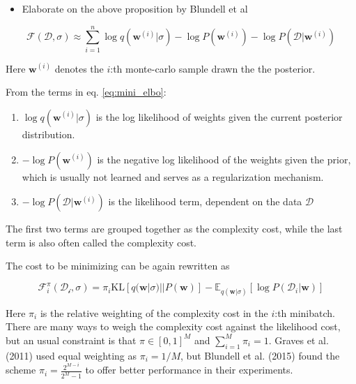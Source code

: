 	\begin{itemize}
		\item Elaborate on the above proposition by Blundell et al
	\end{itemize}
	
	\begin{equation}
	\label{eq:mini_elbo}
	\mathcal{F}(\mathcal{D}, \sigma) \approx \sum_{i=1}^{n}\log q(\pmb{w}^{(i)}|\sigma) - \log P(\pmb{w}^{(i)}) - \log P(\mathcal{D}|\pmb{w}^{(i)})
	\end{equation}
	
	Here $\pmb{w}^{(i)}$ denotes the $i$:th monte-carlo sample drawn the the posterior.
	
	From the terms in eq. \ref{eq:mini_elbo}:
	\begin{enumerate}
		\item $\log q(\pmb{w}^{(i)}|\sigma)$ is the log likelihood of weights given the current posterior distribution.
		
		\item $-\log P(\pmb{w}^{(i)})$ is the negative log likelihood of the weights given the prior, which is usually not learned and serves as a regularization mechanism. 
		
		\item $- \log P(\mathcal{D}|\pmb{w}^{(i)})$ is the likelihood term, dependent on the data $\mathcal{D}$
	\end{enumerate}
	
	\vspace*{2mm}
	The first two terms are grouped together as the complexity cost, while the last term is also often called the complexity cost. 
	
	The cost to be minimizing can be again rewritten as 
	
	\begin{equation}
		\mathcal{F}^\pi_i(\mathcal{D_i}, \sigma) = \pi_i \text{KL}[q(\pmb{w}|\sigma) || P(\pmb{w})] - \mathbb{E}_{q(\pmb{w}|\sigma)}[\log P(\mathcal{D}_i|\pmb{w})]
	\end{equation}
	
	Here $\pi_i$ is the relative weighting of the complexity cost in the $i$:th minibatch. 
	There are many ways to weigh the complexity cost against the likelihood cost, but an usual constraint is that $\pi \in [0,1]^M$ and $\sum_{i=1}^{M} \pi_i = 1$. Graves et al. (2011) \cite{graves_practical_2011} used equal weighting as $\pi_i = 1/M$, but Blundell et al. (2015) \cite{blundell_weight_2015} found the scheme $\pi_i =\frac{2^{M-i}}{2^M - 1}$ to offer better performance in their experiments. 

